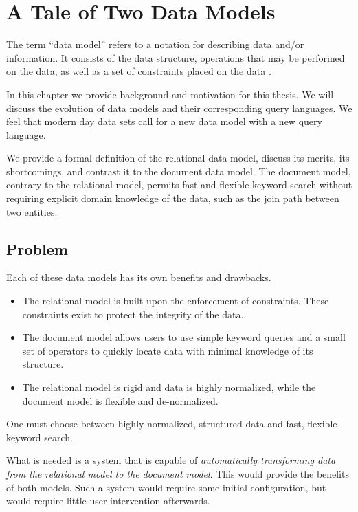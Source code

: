 \chapter{A Tale of Two Data Models}
\label{chap:tale-of-two-data-models}
	The term ``data model'' refers to a notation for describing data and/or information.  It consists of the data structure, operations that may be performed on the data, as well as a set of constraints placed on the data \cite{dbsys-06}.
	
	In this chapter we provide background and motivation for this thesis.  We will discuss the evolution of data models and their corresponding query languages.  We feel that modern day data sets call for a new data model with a new query language.
	
	We provide a formal definition of the relational data model, discuss its merits, its shortcomings, and contrast it to the document data model.  The document model, contrary to the relational model, permits fast and flexible keyword search without requiring explicit domain knowledge of the data, such as the join path between two entities.
	
	
	
	
	
	\section{Problem}
		Each of these data models has its own benefits and drawbacks.
		
		\begin{itemize}
			\item The relational model is built upon the enforcement of constraints.  These constraints exist to protect the integrity of the data.
			\item The document model allows users to use simple keyword queries and a small set of operators to quickly locate data with minimal knowledge of its structure.
			\item The relational model is rigid and data is highly normalized, while the document model is flexible and de-normalized.
		\end{itemize}
		
		One must choose between highly normalized, structured data and fast, flexible keyword search.
		
		What is needed is a system that is capable of \textit{automatically transforming data from the relational model to the document model}.  This would provide the benefits of both models.  Such a system would require some initial configuration, but would require little user intervention afterwards.
	
